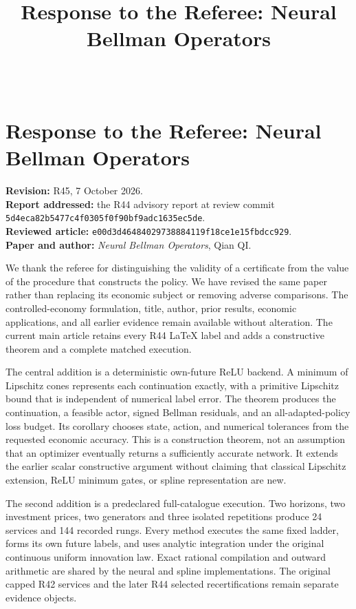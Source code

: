 \documentclass[ecta,nameyear,draft]{econsocart}
\begin{document}
\begin{frontmatter}\title{Response to the Referee: Neural Bellman Operators}
\begin{aug}\author[id=au1,addressref={add1}]{~}\address[id=add1]{Peking University}\end{aug}
\end{frontmatter}
\hypertarget{response-to-the-referee-neural-bellman-operators}{%
\section{Response to the Referee: Neural Bellman
Operators}\label{response-to-the-referee-neural-bellman-operators}}

\textbf{Revision:} R45, 7 October 2026.\\
\textbf{Report addressed:} the R44 advisory report at review commit
\nolinkurl{5d4eca82b5477c4f0305f0f90bf9adc1635ec5de}.\\
\textbf{Reviewed article:}
\nolinkurl{e00d3d46484029738884119f18ce1e15fbdcc929}.\\
\textbf{Paper and author:} \emph{Neural Bellman Operators}, Qian QI.

We thank the referee for distinguishing the validity of a certificate
from the value of the procedure that constructs the policy. We have
revised the same paper rather than replacing its economic subject or
removing adverse comparisons. The controlled-economy formulation, title,
author, prior results, economic applications, and all earlier evidence
remain available without alteration. The current main article retains
every R44 LaTeX label and adds a constructive theorem and a complete
matched execution.

The central addition is a deterministic own-future ReLU backend. A
minimum of Lipschitz cones represents each continuation exactly, with a
primitive Lipschitz bound that is independent of numerical label error.
The theorem produces the continuation, a feasible actor, signed Bellman
residuals, and an all-adapted-policy loss budget. Its corollary chooses
state, action, and numerical tolerances from the requested economic
accuracy. This is a construction theorem, not an assumption that an
optimizer eventually returns a sufficiently accurate network. It extends
the earlier scalar constructive argument without claiming that classical
Lipschitz extension, ReLU minimum gates, or spline representation are
new.

The second addition is a predeclared full-catalogue execution. Two
horizons, two investment prices, two generators and three isolated
repetitions produce 24 services and 144 recorded rungs. Every method
executes the same fixed ladder, forms its own future labels, and uses
analytic integration under the original continuous uniform innovation
law. Exact rational compilation and outward arithmetic are shared by the
neural and spline implementations. The original capped R42 services and
the later R44 selected recertifications remain separate evidence
objects.
\end{document}
